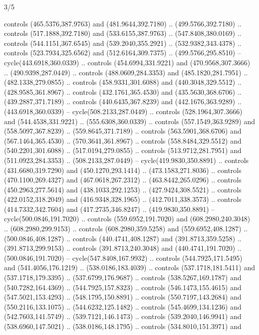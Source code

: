 \begin{flagdescription}{3/5}
\begin{scope}[xshift=0.5\flaglength]
\begin{scope}[scale=0.00167\flagwidth,yshift=210.9mm,xshift=-175.8mm]
\begin{scope}[y=-1pt, x=1pt]
  controls (465.5376,387.9763) and (481.9644,392.7180) .. (499.5766,392.7180) ..
  controls (517.1888,392.7180) and (533.6155,387.9763) .. (547.8408,380.0169) ..
  controls (544.1151,367.6545) and (539.2040,355.2921) .. (532.9382,343.4378) ..
  controls (523.7934,325.6562) and (512.6164,309.7375) .. (499.5766,295.8510) --
  cycle(443.6918,360.0339) .. controls (454.6994,331.9221) and
  (470.9568,307.3666) .. (490.9398,287.0449) .. controls (488.0609,284.3353) and
  (485.1820,281.7951) .. (482.1338,279.0855) .. controls (458.9331,301.6088) and
  (440.3048,329.5512) .. (428.9585,361.8967) .. controls (432.1761,365.4530) and
  (435.5630,368.6706) .. (439.2887,371.7189) .. controls (440.6435,367.8239) and
  (442.1676,363.9289) .. (443.6918,360.0339) -- cycle(508.2133,287.0449) ..
  controls (528.1964,307.3666) and (544.4538,331.9221) .. (555.6308,360.0339) ..
  controls (557.1549,363.9289) and (558.5097,367.8239) .. (559.8645,371.7189) ..
  controls (563.5901,368.6706) and (567.1464,365.4530) .. (570.3641,361.8967) ..
  controls (558.8484,329.5512) and (540.2201,301.6088) .. (517.0194,279.0855) ..
  controls (513.9712,281.7951) and (511.0923,284.3353) .. (508.2133,287.0449) --
  cycle(419.9830,350.8891) .. controls (431.6680,319.7290) and
  (450.1270,293.1414) .. (473.1583,271.8036) .. controls (470.1100,269.4327) and
  (467.0618,267.2312) .. (463.8442,265.0296) .. controls (450.2963,277.5614) and
  (438.1033,292.1253) .. (427.9424,308.5521) .. controls (422.0152,318.2049) and
  (416.9348,328.1965) .. (412.7011,338.3573) .. controls (414.7332,342.7604) and
  (417.2735,346.8247) .. (419.9830,350.8891) -- cycle(500.0846,191.7020) ..
  controls (559.6952,191.7020) and (608.2980,240.3048) .. (608.2980,299.9153) ..
  controls (608.2980,359.5258) and (559.6952,408.1287) .. (500.0846,408.1287) ..
  controls (440.4741,408.1287) and (391.8713,359.5258) .. (391.8713,299.9153) ..
  controls (391.8713,240.3048) and (440.4741,191.7020) .. (500.0846,191.7020) --
  cycle(547.8408,167.9932) .. controls (544.7925,171.5495) and
  (541.4056,176.1219) .. (538.0186,183.4039) .. controls (537.1718,181.5411) and
  (537.1718,179.3395) .. (537.6799,176.9687) .. controls (538.5267,169.1787) and
  (540.7282,164.4369) .. (544.7925,157.8323) .. controls (546.1473,155.4615) and
  (547.5021,153.4293) .. (548.1795,150.8891) .. controls (550.7197,143.2684) and
  (550.2116,133.1075) .. (544.6232,125.1482) .. controls (545.4699,134.1236) and
  (542.7603,141.5749) .. (539.7121,146.1473) .. controls (539.2040,146.9941) and
  (538.6960,147.5021) .. (538.0186,148.1795) .. controls (534.8010,151.3971) and

\end{scope}
\end{scope}
\end{scope}
\end{flagdescription}
